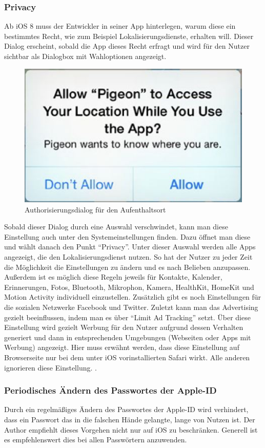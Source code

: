 		\subsubsection{Privacy}
			Ab iOS 8 muss der Entwickler in seiner App hinterlegen, warum diese ein
			bestimmtes Recht, wie zum Beispiel Lokalisierungsdienste, erhalten will.
			Dieser Dialog erscheint, sobald die App dieses Recht erfragt und wird für den
			Nutzer sichtbar als Dialogbox mit Wahloptionen angezeigt.
			\begin{figure}[h]
				\centering
				\includegraphics[width=0.4\linewidth]{ios/media/privacy-dialog.jpg}
				\caption{Authorisierungsdialog für den Aufenthaltsort 
				\cite[S.535]{LearnIOS7Dev2013}}
				\label{fig:privacy-dialog}
			\end{figure}
			Sobald dieser Dialog durch eine Auswahl verschwindet, kann man diese
			Einstellung auch unter den Systemeinstellungen finden. Dazu öffnet man diese
			und wählt danach den Punkt "`Privacy"'. Unter dieser Auswahl werden alle Apps
			angezeigt, die den Lokalisierungsdienst nutzen. So hat der Nutzer zu jeder
			Zeit die Möglichkeit die Einstellungen zu ändern und es nach Belieben
			anzupassen. Außerdem ist es möglich diese Regeln jeweils für
			Kontakte, Kalender, Erinnerungen, Fotos, Bluetooth, Mikrophon, Kamera,
			HealthKit, HomeKit und Motion Activity individuell einzustellen. Zusätzlich
			gibt es noch Einstellungen für die sozialen Netzwerke Facebook und Twitter.
			Zuletzt kann man das Advertising gezielt beeinflussen, indem man es über
			"`Limit Ad Tracking"' setzt. Über diese Einstellung wird gezielt Werbung für
			den Nutzer aufgrund dessen Verhalten generiert und dann in entsprechenden
			Umgebungen (Webseiten oder Apps mit Werbung) angezeigt. Hier muss erwähnt
			werden, dass diese Einstellung auf Browserseite nur bei dem unter iOS
			vorinstallierten Safari wirkt. Alle anderen ignorieren diese Einstellung.
			\cite{AppleMngPrivacy2015}\cite[S.131]{IKungFu2014}.
		\subsubsection{Periodisches Ändern des Passwortes der Apple-ID}
			Durch ein regelmäßiges Ändern des Passwortes der Apple-ID wird verhindert,
			dass ein Passwort das in die falschen Hände gelangte, lange von Nutzen ist.
			Der Author empfiehlt dieses Vorgehen nicht nur auf iOS zu beschränken.
			Generell ist es empfehlenswert dies bei allen Passwörtern anzuwenden.
